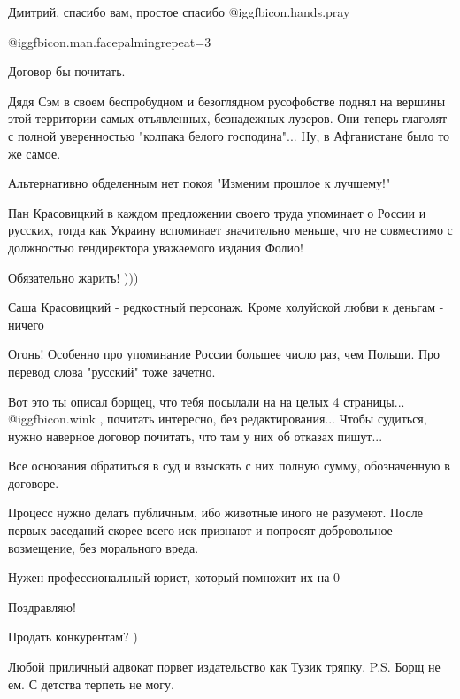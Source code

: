 \begin{itemize}
Дмитрий, спасибо вам, простое спасибо  @igg{fbicon.hands.pray} 

 @igg{fbicon.man.facepalming}{repeat=3} 

Договор бы почитать.


Дядя Сэм в своем беспробудном и безоглядном русофобстве поднял на вершины этой
территории самых отъявленных, безнадежных лузеров. Они теперь глаголят с полной
уверенностью "колпака белого господина"... Ну, в Афганистане было то же самое.

Альтернативно обделенным нет покоя
"Изменим прошлое к лучшему!"

Пан Красовицкий в каждом предложении своего труда упоминает о России и русских, тогда как Украину вспоминает значительно меньше, что не совместимо с должностью гендиректора уважаемого издания Фолио!

Обязательно жарить! )))

Саша Красовицкий - редкостный персонаж. Кроме холуйской любви к деньгам - ничего

Огонь! Особенно про упоминание России большее число раз, чем Польши. Про перевод слова "русский" тоже зачетно.

Вот это ты описал борщец, что тебя посылали на на целых 4 страницы...  @igg{fbicon.wink} , почитать интересно, без редактирования... Чтобы судиться, нужно наверное договор почитать, что там у них об отказах пишут...


Все основания обратиться в суд и взыскать с них полную сумму, обозначенную в
договоре.

Процесс нужно делать публичным, ибо животные иного не разумеют. После первых
заседаний скорее всего иск признают и попросят добровольное возмещение, без
морального вреда.

Нужен профессиональный юрист, который помножит их на 0

Поздравляю!

Продать конкурентам? )

Любой приличный адвокат порвет издательство как Тузик тряпку.
P.S. Борщ не ем. С детства терпеть не могу.



\end{itemize}
